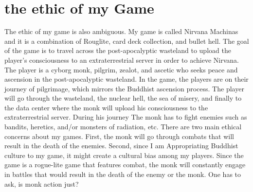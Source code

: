 \documentclass[10pt,twocolumn]{article}
\begin{document}
\section{the ethic of my Game}

The ethic of my game is also ambiguous. My game is called Nirvana Machinas and it is a combination of Rouglite, card deck collection, and bullet hell. The goal of the game is to travel across the post-apocalyptic wasteland to upload the player’s consciousness to an extraterrestrial server in order to achieve Nirvana.  The player is a cyborg monk, pilgrim, zealot, and ascetic who seeks peace and ascension in the post-apocalyptic wasteland.  In the game, the players are on their journey of pilgrimage, which mirrors the Buddhist ascension process.  The player will go through the wasteland, the nuclear hell, the sea of misery, and finally to the data center where the monk will upload his consciousness to the extraterrestrial server. During his journey 
The monk has to fight enemies such as bandits, heretics, and/or monsters of radiation, etc. 
There are two main ethical concerns about my games. First, the monk will go through combats that will result in the death of the enemies. Second, since I am Appropriating Buddhist culture to my game, it might create a cultural bias among my players. 
Since the game is a rogue-lite game that features combat, the monk will constantly engage in battles that would result in the death of the enemy or the monk. One has to ask, is monk action just? 
\end{document}
